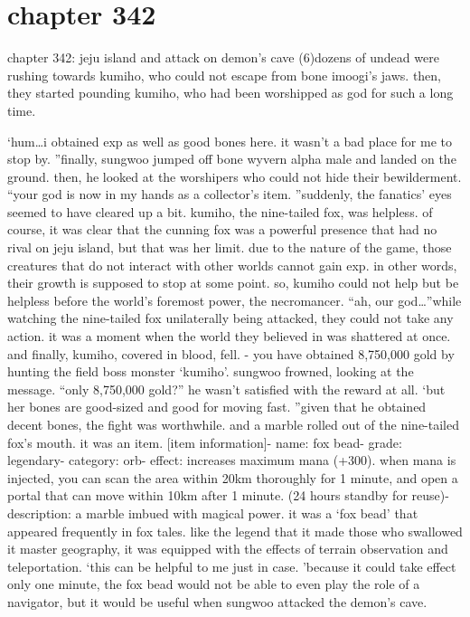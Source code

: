 \section{chapter 342}

chapter 342: jeju island and attack on demon’s cave (6)dozens of undead were rushing towards kumiho, who could not escape from bone imoogi’s jaws.
 then, they started pounding kumiho, who had been worshipped as god for such a long time.





‘hum…i obtained exp as well as good bones here.
 it wasn’t a bad place for me to stop by.
”finally, sungwoo jumped off bone wyvern alpha male and landed on the ground.
then, he looked at the worshipers who could not hide their bewilderment.
“your god is now in my hands as a collector’s item.
”suddenly, the fanatics’ eyes seemed to have cleared up a bit.
kumiho, the nine-tailed fox, was helpless.
of course, it was clear that the cunning fox was a powerful presence that had no rival on jeju island, but that was her limit.
due to the nature of the game, those creatures that do not interact with other worlds cannot gain exp.
 in other words, their growth is supposed to stop at some point.
so, kumiho could not help but be helpless before the world’s foremost power, the necromancer.
“ah, our god…”while watching the nine-tailed fox unilaterally being attacked, they could not take any action.
 it was a moment when the world they believed in was shattered at once.
and finally, kumiho, covered in blood, fell.
- you have obtained 8,750,000 gold by hunting the field boss monster ‘kumiho’.
sungwoo frowned, looking at the message.
“only 8,750,000 gold?”
he wasn’t satisfied with the reward at all.
‘but her bones are good-sized and good for moving fast.
”given that he obtained decent bones, the fight was worthwhile.
 and a marble rolled out of the nine-tailed fox’s mouth.
 it was an item.
[item information]- name: fox bead- grade: legendary- category: orb- effect: increases maximum mana (+300).
 when mana is injected, you can scan the area within 20km thoroughly for 1 minute, and open a portal that can move within 10km after 1 minute.
 (24 hours standby for reuse)- description: a marble imbued with magical power.
it was a ‘fox bead’ that appeared frequently in fox tales.
 like the legend that it made those who swallowed it master geography, it was equipped with the effects of terrain observation and teleportation.
‘this can be helpful to me just in case.
’because it could take effect only one minute, the fox bead would not be able to even play the role of a navigator, but it would be useful when sungwoo attacked the demon’s cave.

